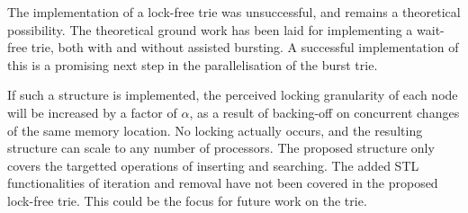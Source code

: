 The implementation of a lock-free trie was unsuccessful, and remains a
theoretical possibility. The theoretical ground work has been laid for
implementing a wait-free trie, both with and without assisted bursting.
A successful implementation of this is a promising next step in the
parallelisation of the burst trie.

If such a structure is implemented, the perceived locking granularity of each
node will be increased by a factor of $\alpha$, as a result of backing-off on
concurrent changes of the same memory location. No locking actually occurs,
and the resulting structure can scale to any number of processors.
The proposed structure only covers the targetted operations of inserting
and searching. The added STL functionalities of iteration and removal
have not been covered in the proposed lock-free trie. This could be the
focus for future work on the trie.

%
%
%
%
%
